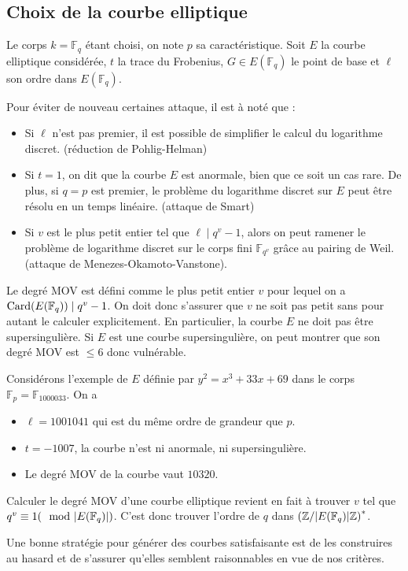 \subsection{Choix de la courbe elliptique}
Le corps $k = \mathbb{F}_{q}$ étant choisi, on note $p$ sa caractéristique. Soit $E$ la courbe
elliptique considérée, $t$ la trace du Frobenius, $G \in E(\mathbb{F}_{q})$ le point de base et
$\ell$ son ordre dans $E(\mathbb{F}_{q})$.

Pour éviter de nouveau certaines attaque, il est à noté que :
\begin{itemize}
    \item Si $\ell$ n'est pas premier, il est possible de simplifier le calcul du logarithme
        discret. (réduction de Pohlig-Helman)
    \item Si $t=1$, on dit que la courbe $E$ est anormale, bien que ce soit un cas rare. De
        plus, si $q = p$ est premier, le problème du logarithme discret sur $E$ peut être
        résolu en un temps linéaire. (attaque de Smart)
    \item Si $v$ est le plus petit entier tel que $\ell \mid q^{v}-1$, alors on peut ramener le
        problème de logarithme discret sur le corps fini $\mathbb{F}_{q^{v}}$ grâce au pairing
        de Weil. (attaque de Menezes-Okamoto-Vanstone).
\end{itemize}

Le degré MOV est défini comme le plus petit entier $v$ pour lequel on a
$\operatorname{Card}(E(\mathbb{F}_{q})) \mid q^{v} - 1$. On doit donc s'assurer que $v$ ne soit pas petit
sans pour autant le calculer explicitement. En particulier, la courbe $E$ ne doit pas être
supersingulière. Si $E$ est une courbe supersingulière, on peut montrer que son degré MOV est
$\le 6$ donc vulnérable.

\begin{exemple}
    Considérons l'exemple de $E$ définie par $y^2 = x^3 + 33x + 69$ dans le corps
    $\mathbb{F}_{p} = \mathbb{F}_{1000033}$. On a 
    \begin{itemize}
        \item  $\ell = 1001041$ qui est du même ordre de grandeur que $p$.
        \item $t = -1007$, la courbe n'est ni anormale, ni supersingulière.
        \item Le degré MOV de la courbe vaut $10320$.

    \end{itemize}

Calculer le degré MOV d'une courbe elliptique revient en fait à trouver $v$ tel que
$q^{v} \equiv 1 (\mod |E(\mathbb{F}_{q})|)$. C'est donc trouver l'ordre de $q$
dans $\left( \mathbb{Z} / |E(\mathbb{F}_{q})|\mathbb{Z} \right) ^{*}$.

Une bonne stratégie pour générer des courbes satisfaisante est de les construires
au hasard et de s'assurer qu'elles semblent raisonnables en vue de nos critères.
\end{exemple}

